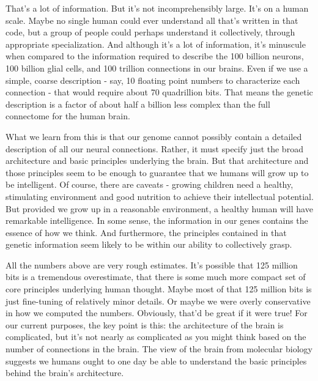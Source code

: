 That's a lot of information. But it's not incomprehensibly large. It's on a human scale. Maybe no single human could ever understand all that's written in that code, but a group of people could perhaps understand it collectively, through appropriate specialization. And although it's a lot of information, it's minuscule when compared to the information required to describe the 100 billion neurons, 100 billion glial cells, and 100 trillion connections in our brains. Even if we use a simple, coarse description - say, 10 floating point numbers to characterize each connection - that would require about 70 quadrillion bits. That means the genetic description is a factor of about half a billion less complex than the full connectome for the human brain.


What we learn from this is that our genome cannot possibly contain a detailed description of all our neural connections. Rather, it must specify just the broad architecture and basic principles underlying the brain. But that architecture and those principles seem to be enough to guarantee that we humans will grow up to be intelligent. Of course, there are caveats - growing children need a healthy, stimulating environment and good nutrition to achieve their intellectual potential. But provided we grow up in a reasonable environment, a healthy human will have remarkable intelligence. In some sense, the information in our genes contains the essence of how we think. And furthermore, the principles contained in that genetic information seem likely to be within our ability to collectively grasp.


All the numbers above are very rough estimates. It's possible that 125 million bits is a tremendous overestimate, that there is some much more compact set of core principles underlying human thought. Maybe most of that 125 million bits is just fine-tuning of relatively minor details. Or maybe we were overly conservative in how we computed the numbers. Obviously, that'd be great if it were true! For our current purposes, the key point is this: the architecture of the brain is complicated, but it's not nearly as complicated as you might think based on the number of connections in the brain. The view of the brain from molecular biology suggests we humans ought to one day be able to understand the basic principles behind the brain's architecture.


